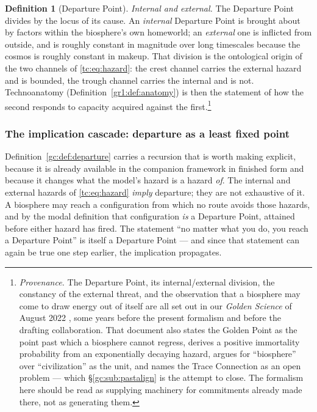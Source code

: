 \documentclass[11pt]{article}
\numberwithin{equation}{section}
\theoremstyle{plain}
\theoremstyle{definition}
\newtheorem{definition}[theorem]{Definition}
\theoremstyle{remark}
\begin{document}
\begin{definition}[Departure Point]
\emph{Internal and external.} The Departure Point divides by the
locus of its cause. An \emph{internal} Departure Point is brought about
by factors within the biosphere's own homeworld; an \emph{external} one
is inflicted from outside, and is roughly constant in magnitude over
long timescales because the cosmos is roughly constant in makeup. That
division is the ontological origin of the two channels of
\eqref{tc:eq:hazard}: the crest channel carries the external hazard and
is bounded, the trough channel carries the internal and is not.
Technoanatomy (Definition~\ref{gr1:def:anatomy}) is then the statement
of how the second responds to capacity acquired against the
first.\footnote{\emph{Provenance.} The Departure Point, its
internal/external division, the constancy of the external threat, and
the observation that a biosphere may come to draw energy out of itself
are all set out in our \emph{Golden Science} of August 2022
\cite{GoldenScience22}, some years before the present formalism and
before the drafting collaboration. That document also states the Golden Point as the point
past which a biosphere cannot regress, derives a positive immortality
probability from an exponentially decaying hazard, argues for
``biosphere'' over ``civilization'' as the unit, and names the Trace
Connection as an open problem --- which \S\ref{gc:sub:pastalign} is the
attempt to close. The formalism here should be read as supplying
machinery for commitments already made there, not as generating
them.}
\end{definition}

\subsubsection{The implication cascade: departure as a least fixed point}
\label{gc:subsub:cascade}

Definition~\ref{gc:def:departure} carries a recursion that is worth
making explicit, because it is already available in the companion
framework in finished form and because it changes what the model's
hazard is a hazard \emph{of}. The internal and external hazards of \eqref{tc:eq:hazard} \emph{imply}
departure; they are not exhaustive of it. A biosphere may reach a
configuration from which no route avoids those hazards, and by the
modal definition that configuration \emph{is} a Departure Point,
attained before either hazard has fired. The statement ``no matter what
you do, you reach a Departure Point'' is itself a Departure Point ---
and since that statement can again be true one step earlier, the
implication propagates.
\end{document}
